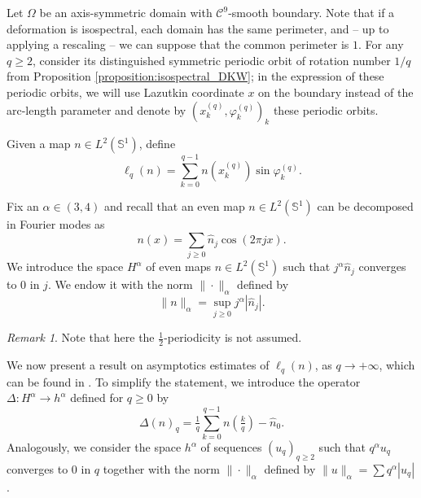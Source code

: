 \documentclass[12pt, openany]{amsart}
\theoremstyle{definition}
\theoremstyle{remark}
\theoremstyle{remark}
\newtheorem{remark}[theorem]{Remark}
\theoremstyle{theorem}
\theoremstyle{theorem}
\theoremstyle{theorem}
\theoremstyle{theorem}
\renewcommand{\SS}{\mathbb{S}}
\begin{document}
Let $\Omega$ be an axis-symmetric domain with $\mathscr C^9$-smooth boundary. Note that if a deformation is isospectral, each domain has the same perimeter, and -- up to applying a rescaling --  we can suppose that the common perimeter is $1$. For any $q\geq 2$, consider its distinguished symmetric periodic orbit of rotation number $1/q$ from Proposition \ref{proposition:isospectral_DKW}; 
in the expression of these periodic orbits, we will use Lazutkin coordinate $x$ on the boundary instead of the arc-length parameter and denote by $(x_k^{(q)},\varphi_k^{(q)})_k$ these periodic orbits.

Given a map $n\in L^2(\SS^1)$, define
\[
\ell_q(n) = \sum_{k=0}^{q-1}n(x_k^{(q)})\sin\varphi_k^{(q)}.
\]

Fix an $\alpha\in(3,4)$ and recall that an even map $n\in L^2(\SS^1)$ can be decomposed in Fourier modes as
\[
n(x) = \sum_{j\geq 0}\widehat n_j \cos(2\pi jx).
\]
We introduce the space $H^{\alpha}$ of even maps $n\in L^2(\SS^1)$ such that $j^{\alpha}\widehat n_j$ converges to $0$ in $j$. We endow it with the norm $\|\cdot\|_{\alpha}$ defined by
\[
\|n\|_{\alpha} = \sup_{j\geq 0} j^{\alpha}|\widehat n_{j}|.
\]

\begin{remark}
Note that here the $\tfrac{1}{2}$-periodicity is not assumed.
\end{remark}

We now present a result on asymptotics estimates of $\ell_q(n)$, as $q\to+\infty$, which can be found in \cite{DKW}. To simplify the statement, we introduce the operator 
$\Delta:H^{\alpha}\to h^{\alpha}$ defined for $q\geq 0$ by
\[
\Delta(n)_q = \tfrac{1}{q}\sum_{k=0}^{q-1}n\left(\tfrac{k}{q}\right)-\widehat n_0.
\]
Analogously, we consider the space $h^{\alpha}$ of sequences $(u_q)_{q\geq 2}$ such that $q^{\alpha}u_q$ converges to $0$ in $q$ together  with the norm $\|\cdot\|_{\alpha}$ defined by $\|u\|_{\alpha} = \sum q^{\alpha}|u_q|$.
\end{document}
